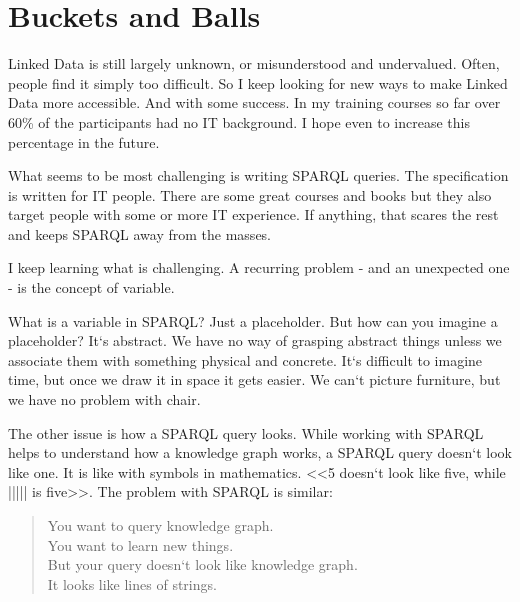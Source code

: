 
\setchapterpreamble[u]{\margintoc}
\chapter{Buckets and Balls\protect\footnotemark}


Linked Data is still largely unknown, or misunderstood and undervalued. Often, people find it simply too difficult. So I keep looking for new ways to make Linked Data more accessible. And with some success. In my training courses so far over 60\% of the participants had no IT background. I hope even to increase this percentage in the future.

What seems to be most challenging is writing SPARQL queries. The specification is written for IT people. There are some great courses and books but they also target people with some or more IT experience. If anything, that scares the rest and keeps SPARQL away from the masses.

I keep learning what is challenging. A recurring problem - and an unexpected one - is the concept of variable.

What is a variable in SPARQL? Just a placeholder. But how can you imagine a placeholder? It`s abstract. We have no way of grasping abstract things unless we associate them with something physical and concrete. It`s difficult to imagine time, but once we draw it in space it gets easier. We can`t picture furniture, but we have no problem with chair.

The other issue is how a SPARQL query looks. While working with SPARQL helps to understand how a knowledge graph works, a SPARQL query doesn`t look like one. It is like with symbols in mathematics. <<5 doesn`t look like five, while ||||| is five>>. The problem with SPARQL is similar:

\begin{quote}
You want to query knowledge graph.\\
You want to learn new things.\\
But your query doesn`t look like knowledge graph.\\
It looks like lines of strings.\\
\end{quote}

